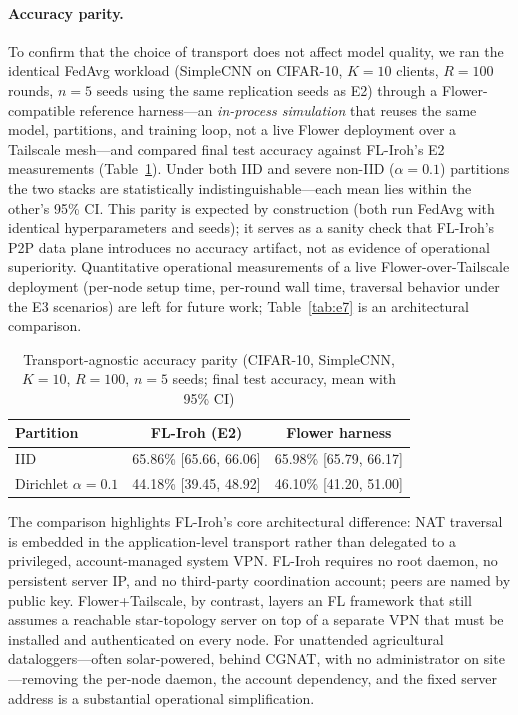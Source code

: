 \documentclass[a4paper,fleqn]{cas-dc}
\begin{document}
\paragraph{Accuracy parity.}
To confirm that the choice of transport does not affect model quality, we ran the identical FedAvg workload (SimpleCNN on CIFAR-10, $K{=}10$ clients, $R{=}100$ rounds, $n{=}5$ seeds using the same replication seeds as E2) through a Flower-compatible reference harness---an \emph{in-process simulation} that reuses the same model, partitions, and training loop, not a live Flower deployment over a Tailscale mesh---and compared final test accuracy against FL-Iroh's E2 measurements (Table~\ref{tab:e7acc}). Under both IID and severe non-IID ($\alpha{=}0.1$) partitions the two stacks are statistically indistinguishable---each mean lies within the other's 95\% CI. This parity is expected by construction (both run FedAvg with identical hyperparameters and seeds); it serves as a sanity check that FL-Iroh's P2P data plane introduces no accuracy artifact, not as evidence of operational superiority. Quantitative operational measurements of a live Flower-over-Tailscale deployment (per-node setup time, per-round wall time, traversal behavior under the E3 scenarios) are left for future work; Table~\ref{tab:e7} is an architectural comparison.

\begin{table}[t]
\centering
\caption{Transport-agnostic accuracy parity (CIFAR-10, SimpleCNN, $K{=}10$, $R{=}100$, $n{=}5$ seeds; final test accuracy, mean with 95\% CI)}
\label{tab:e7acc}
\scriptsize
\renewcommand{\arraystretch}{1.25}
\setlength{\tabcolsep}{3.5pt}
\begin{tabular}{l c c}
\toprule
\textbf{Partition} & \textbf{FL-Iroh (E2)} & \textbf{Flower harness} \\
\midrule
IID                      & 65.86\% [65.66, 66.06] & 65.98\% [65.79, 66.17] \\
Dirichlet $\alpha{=}0.1$ & 44.18\% [39.45, 48.92] & 46.10\% [41.20, 51.00] \\
\bottomrule
\end{tabular}
\end{table}

The comparison highlights FL-Iroh's core architectural difference: NAT traversal is embedded in the application-level transport rather than delegated to a privileged, account-managed system VPN. FL-Iroh requires no root daemon, no persistent server IP, and no third-party coordination account; peers are named by public key. Flower+Tailscale, by contrast, layers an FL framework that still assumes a reachable star-topology server on top of a separate VPN that must be installed and authenticated on every node. For unattended agricultural dataloggers---often solar-powered, behind CGNAT, with no administrator on site---removing the per-node daemon, the account dependency, and the fixed server address is a substantial operational simplification.
\end{document}
